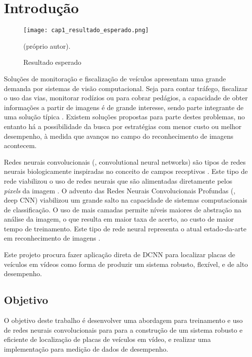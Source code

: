 
\chapter{Introdução}

\begin{figure}[!htb]
	\centering
	\texttt{[image: cap1\_resultado\_esperado.png]}
	\caption{Resultado esperado}
	\label{fig:cap1_resultado_esperado}
	(próprio autor).
\end{figure}

Soluções de monitoração e fiscalização de veículos apresentam
uma grande demanda por sistemas de visão computacional. Seja
para contar tráfego, fiscalizar o uso das vias, monitorar
rodízios ou para cobrar pedágios, a capacidade de obter
informações a partir de imagens é de grande interesse, sendo parte integrante
de uma solução típica \cite{anagnostopoulos2008license}.  Existem
soluções propostas para parte destes problemas, no entanto há a
possibilidade da busca por estratégias com menor custo ou melhor
desempenho, à medida que avanços no campo do reconhecimento de
imagens acontecem.

Redes neurais convolucionais (, convolutional neural networks)
são tipos de redes neurais biologicamente inspiradas no conceito
de campos receptivos \cite{hubel1968receptive}. Este tipo de
rede viabilizou o uso de redes neurais que são alimentadas
diretamente pelos \emph{pixels} da imagem \cite{lecun1998gradient}. O
advento das Redes Neurais Convolucionais Profundas (, deep CNN)
viabilizou um grande salto na capacidade de sistemas computacionais
de classificação. O uso de mais camadas permite níveis maiores de
abstração na análise da imagem, o que resulta em maior taxa de
acerto, ao custo de maior tempo de treinamento. Este tipo de rede
neural representa o atual estado-da-arte em reconhecimento de
imagens \cite{szegedy2015going}.

Este projeto procura fazer aplicação direta de DCNN para localizar
placas de veículos em vídeos como forma de produzir um sistema
robusto, flexível, e de alto desempenho.

\section{Objetivo}
O objetivo deste trabalho é desenvolver uma abordagem para
treinamento e uso de redes neurais convolucionais para para a
construção de um sistema robusto e eficiente de localização de
placas de veículos em vídeo, e realizar uma implementação para
medição de dados de desempenho.

